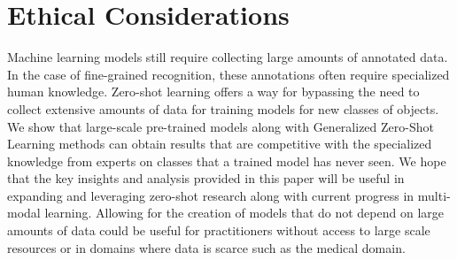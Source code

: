 
\section{Ethical Considerations}
\label{ethical}


Machine learning models still require collecting large amounts of annotated data. In the case of fine-grained recognition, these annotations often require specialized human knowledge. Zero-shot learning offers a way for bypassing the need to collect extensive amounts of data for training models for new classes of objects. 
We show that large-scale pre-trained models along with Generalized Zero-Shot Learning methods can obtain results that are competitive with the specialized knowledge from experts on classes that a trained model has never seen. We hope that the key insights and analysis provided in this paper will be useful in expanding and leveraging zero-shot research along with current progress in multi-modal learning. Allowing for the creation of models that do not depend on large amounts of data could be useful for practitioners without access to large scale resources or in domains where data is scarce such as the medical domain. 
